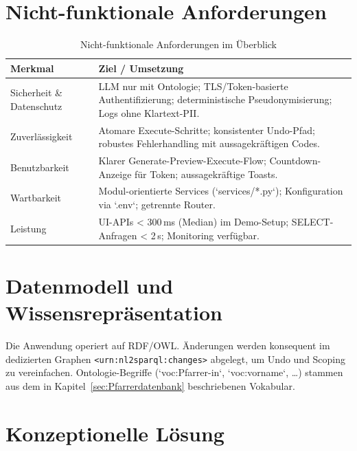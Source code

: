 \section{Nicht-funktionale Anforderungen}
\begin{table}[ht]
  \centering
  \caption[Nicht-funktionale Anforderungen]{Nicht-funktionale Anforderungen im Überblick}
  \label{tab:nicht-funktionale-anforderungen}
  \begin{tabular}{p{}p{}}
    \toprule
    \textbf{Merkmal} & \textbf{Ziel / Umsetzung} \\
    \midrule
    Sicherheit \& Datenschutz & LLM nur mit Ontologie; TLS/Token-basierte Authentifizierung; deterministische Pseudonymisierung; Logs ohne Klartext-PII. \\
    Zuverlässigkeit & Atomare Execute-Schritte; konsistenter Undo-Pfad; robustes Fehlerhandling mit aussagekräftigen Codes. \\
    Benutzbarkeit & Klarer Generate-Preview-Execute-Flow; Countdown-Anzeige für Token; aussagekräftige Toasts. \\
    Wartbarkeit & Modul-orientierte Services (`services/*.py`); Konfiguration via `.env`; getrennte Router. \\
    Leistung & UI-APIs \textless{} 300\,ms (Median) im Demo-Setup; SELECT-Anfragen \textless{} 2\,s; Monitoring verfügbar. \\
    \bottomrule
  \end{tabular}
\end{table}

\section{Datenmodell und Wissensrepräsentation}
Die Anwendung operiert auf RDF/OWL. Änderungen werden konsequent im dedizierten Graphen \texttt{<urn:nl2sparql:changes>} abgelegt, um Undo und Scoping zu vereinfachen. Ontologie-Begriffe (`voc:Pfarrer-in`, `voc:vorname`, …) stammen aus dem in Kapitel~\ref{sec:Pfarrerdatenbank} beschriebenen Vokabular.

\section{Konzeptionelle Lösung}

